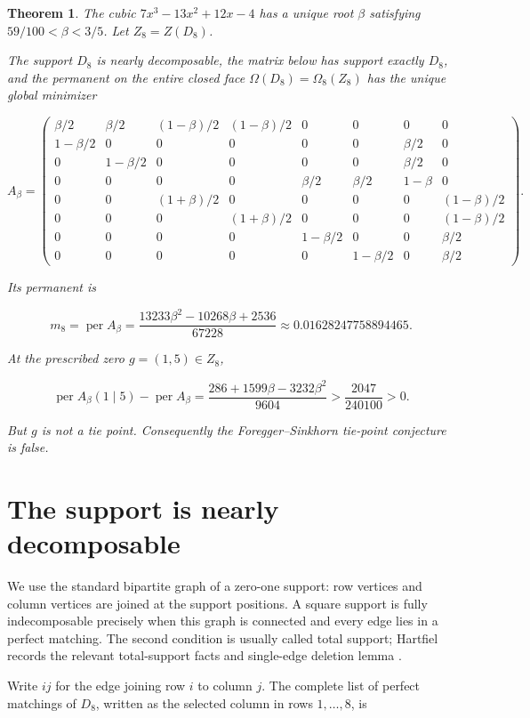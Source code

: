 \documentclass[11pt]{article}
\newtheorem{theorem}{Theorem}
\theoremstyle{definition}
\begin{document}
\begin{theorem}
The cubic
\(7x^3-13x^2+12x-4\) has a unique root \(\beta\) satisfying
\(59/100<\beta<3/5\). Let \(Z_8=Z(D_8)\).

The support \(D_8\) is nearly decomposable, the matrix below has support
exactly \(D_8\), and the permanent on the entire closed face
\(\Omega(D_8)=\Omega_8(Z_8)\) has the unique global minimizer

\[
A_\beta=\begin{pmatrix}
\beta/2&\beta/2&(1-\beta)/2&(1-\beta)/2&0&0&0&0\\
1-\beta/2&0&0&0&0&0&\beta/2&0\\
0&1-\beta/2&0&0&0&0&\beta/2&0\\
0&0&0&0&\beta/2&\beta/2&1-\beta&0\\
0&0&(1+\beta)/2&0&0&0&0&(1-\beta)/2\\
0&0&0&(1+\beta)/2&0&0&0&(1-\beta)/2\\
0&0&0&0&1-\beta/2&0&0&\beta/2\\
0&0&0&0&0&1-\beta/2&0&\beta/2
\end{pmatrix}.
\]

Its permanent is

\[
m_8=\operatorname{per}A_\beta
=\frac{13233\beta^2-10268\beta+2536}{67228}
\approx0.01628247758894465.
\]

At the prescribed zero \(g=(1,5)\in Z_8\),

\[
\operatorname{per}A_\beta(1\mid5)-\operatorname{per}A_\beta
=\frac{286+1599\beta-3232\beta^2}{9604}
>\frac{2047}{240100}>0.
\]

But \(g\) is not a tie point. Consequently the Foregger--Sinkhorn tie-point
conjecture is false.
\end{theorem}

\section{The support is nearly decomposable}

We use the standard bipartite graph of a zero-one support: row vertices and
column vertices are joined at the support positions. A square support is fully
indecomposable precisely when this graph is connected and every edge lies in
a perfect matching. The second condition is usually called total support;
Hartfiel records the relevant total-support facts and single-edge deletion
lemma \cite[pp.~223--224]{hartfiel1971}.

Write \(ij\) for the edge joining row \(i\) to column \(j\). The complete
list of perfect matchings of \(D_8\), written as the selected column in rows
\(1,\ldots,8\), is
\end{document}
